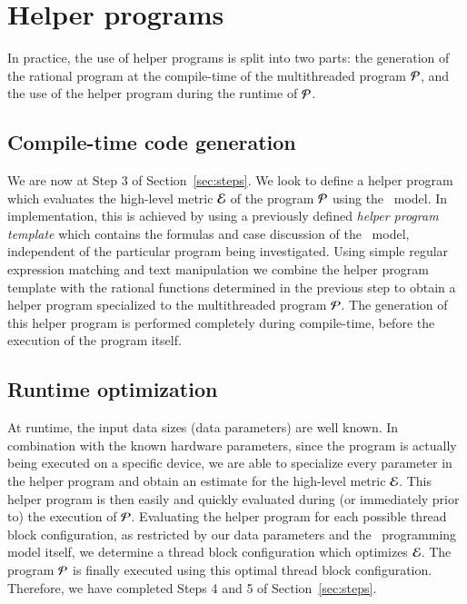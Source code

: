 

\section{Helper programs}

In practice, the use of helper programs is split into two parts:
the generation of the rational program at the compile-time of the multithreaded 
program $\cal{P}$, 
and the use of the helper program during the runtime of $\cal{P}$.

\subsection{Compile-time code generation}
We are now at Step 3 of Section~\ref{sec:steps}.  We look to define a
helper program which evaluates the high-level metric $\cal{E}$ of the
program $\cal{P}$ using the \mwpcwp\ model.  In implementation, this
is achieved by using a previously defined \textit{helper program
template} which contains the formulas and case discussion of
the \mwpcwp\ model, independent of the particular program being
investigated. Using simple regular expression matching and text
manipulation we combine the helper program template with the rational functions 
determined in the previous step to obtain a helper program
specialized to the multithreaded program $\cal{P}$. The generation of
this helper program is performed completely during compile-time,
before the execution of the program itself.

\subsection{Runtime optimization}
At runtime, the input data sizes (data parameters) are well known.
In combination with the known hardware parameters, since the program
is actually being executed on a specific device,
we are able to specialize every parameter in the helper program
and obtain an estimate for the high-level metric $\cal{E}$.
This helper program is then easily and quickly evaluated during
(or immediately prior to) the execution of $\cal{P}$. Evaluating 
the helper program for each possible thread block configuration,
as restricted by our data parameters
and the \cuda\ programming model itself, we determine a thread block configuration
which optimizes $\cal{E}$. The program $\cal{P}$ is finally executed 
using this optimal thread block configuration. 
Therefore, we have completed Steps 4 and 5 of Section~\ref{sec:steps}.

